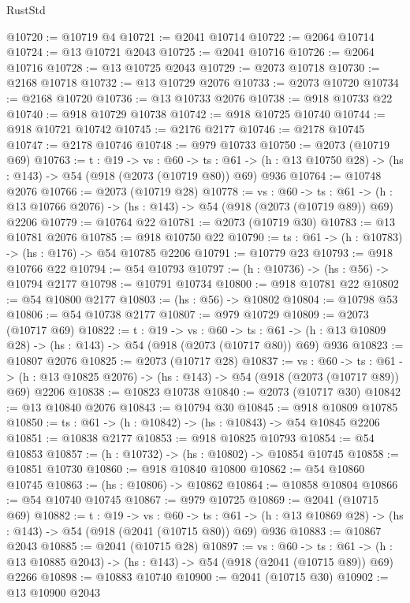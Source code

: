 \begin{lexlean}{RustStd}
\begin{coremodule}
@10720 := @10719 @4
@10721 := @2041 @10714
@10722 := @2064 @10714
@10724 := @13 @10721 @2043
@10725 := @2041 @10716
@10726 := @2064 @10716
@10728 := @13 @10725 @2043
@10729 := @2073 @10718
@10730 := @2168 @10718
@10732 := @13 @10729 @2076
@10733 := @2073 @10720
@10734 := @2168 @10720
@10736 := @13 @10733 @2076
@10738 := @918 @10733 @22
@10740 := @918 @10729 @10738
@10742 := @918 @10725 @10740
@10744 := @918 @10721 @10742
@10745 := @2176 @2177
@10746 := @2178 @10745
@10747 := @2178 @10746
@10748 := @979 @10733
@10750 := @2073 (@10719 @69)
@10763 := {t : @19} ->
  {vs : @60} ->
  {ts : @61} -> (h : @13 @10750 @28) -> (hs : @143) -> @54 (@918 (@2073 (@10719 @80)) @69) @936
@10764 := @10748 @2076
@10766 := @2073 (@10719 @28)
@10778 := {vs : @60} ->
  {ts : @61} -> (h : @13 @10766 @2076) -> (hs : @143) -> @54 (@918 (@2073 (@10719 @89)) @69) @2206
@10779 := @10764 @22
@10781 := @2073 (@10719 @30)
@10783 := @13 @10781 @2076
@10785 := @918 @10750 @22
@10790 := {ts : @61} -> (h : @10783) -> (hs : @176) -> @54 @10785 @2206
@10791 := @10779 @23
@10793 := @918 @10766 @22
@10794 := @54 @10793
@10797 := (h : @10736) -> (hs : @56) -> @10794 @2177
@10798 := @10791 @10734
@10800 := @918 @10781 @22
@10802 := @54 @10800 @2177
@10803 := (hs : @56) -> @10802
@10804 := @10798 @53
@10806 := @54 @10738 @2177
@10807 := @979 @10729
@10809 := @2073 (@10717 @69)
@10822 := {t : @19} ->
  {vs : @60} ->
  {ts : @61} -> (h : @13 @10809 @28) -> (hs : @143) -> @54 (@918 (@2073 (@10717 @80)) @69) @936
@10823 := @10807 @2076
@10825 := @2073 (@10717 @28)
@10837 := {vs : @60} ->
  {ts : @61} -> (h : @13 @10825 @2076) -> (hs : @143) -> @54 (@918 (@2073 (@10717 @89)) @69) @2206
@10838 := @10823 @10738
@10840 := @2073 (@10717 @30)
@10842 := @13 @10840 @2076
@10843 := @10794 @30
@10845 := @918 @10809 @10785
@10850 := {ts : @61} -> (h : @10842) -> (hs : @10843) -> @54 @10845 @2206
@10851 := @10838 @2177
@10853 := @918 @10825 @10793
@10854 := @54 @10853
@10857 := (h : @10732) -> (hs : @10802) -> @10854 @10745
@10858 := @10851 @10730
@10860 := @918 @10840 @10800
@10862 := @54 @10860 @10745
@10863 := (hs : @10806) -> @10862
@10864 := @10858 @10804
@10866 := @54 @10740 @10745
@10867 := @979 @10725
@10869 := @2041 (@10715 @69)
@10882 := {t : @19} ->
  {vs : @60} ->
  {ts : @61} -> (h : @13 @10869 @28) -> (hs : @143) -> @54 (@918 (@2041 (@10715 @80)) @69) @936
@10883 := @10867 @2043
@10885 := @2041 (@10715 @28)
@10897 := {vs : @60} ->
  {ts : @61} -> (h : @13 @10885 @2043) -> (hs : @143) -> @54 (@918 (@2041 (@10715 @89)) @69) @2266
@10898 := @10883 @10740
@10900 := @2041 (@10715 @30)
@10902 := @13 @10900 @2043

\end{coremodule}
\end{lexlean}
